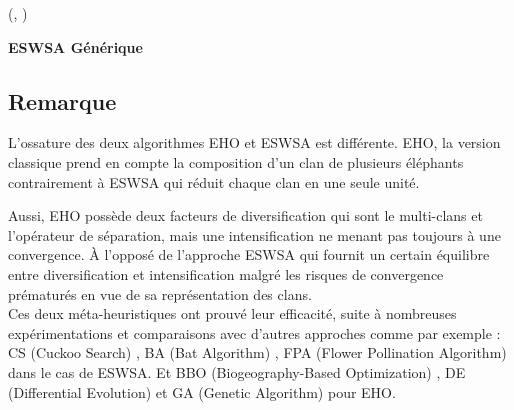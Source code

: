\begin{algorithm}[H]
{		
		\rt(\gbestt , \fg)
		
	}
	
	\caption{\textbf{ESWSA Générique}}
	
\end{algorithm}

\subsection{Remarque}
L'ossature des deux algorithmes EHO et ESWSA est différente. EHO, la version classique prend en compte la composition d'un clan de plusieurs éléphants contrairement à ESWSA qui réduit chaque clan en une seule unité.

Aussi, EHO possède deux facteurs de diversification qui sont le multi-clans et l'opérateur de séparation, mais une intensification ne menant pas toujours à une convergence. À l'opposé de l'approche ESWSA qui fournit un certain équilibre entre diversification et intensification malgré les risques de convergence prématurés en vue de sa représentation des clans.\\

Ces deux méta-heuristiques ont prouvé leur efficacité, suite à nombreuses expérimentations et comparaisons avec d'autres approches comme par exemple : CS (Cuckoo Search) \cite{metaCS}, BA (Bat Algorithm) \cite{metaBat} , FPA (Flower Pollination Algorithm) \cite{FPA} dans le cas de ESWSA.
Et BBO (Biogeography-Based Optimization) \cite{metaBBO}, DE (Differential Evolution) \cite{metaDE} et GA (Genetic Algorithm) \cite{metaGA} pour EHO.



